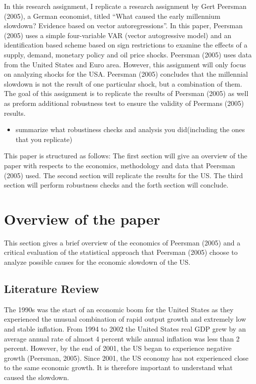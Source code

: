 \documentclass[11pt,preprint, authoryear]{elsarticle}
\numberwithin{equation}{section}
\numberwithin{figure}{section}
\numberwithin{table}{section}
\def\tightlist{} %
\begin{document}
In this research assignment, I replicate a research assignment by Gert
Peersman (2005), a German economist, titled ``What caused the early
millennium slowdown? Evidence based on vector autoregressions''. In this
paper, Peersman (2005) uses a simple four-variable VAR (vector
autogressive model) and an identification based scheme based on sign
restrictions to examine the effects of a supply, demand, monetary policy
and oil price shocks. Peersman (2005) uses data from the United States
and Euro area. However, this assignment will only focus on analyzing
shocks for the USA. Peersman (2005) concludes that the millennial
slowdown is not the result of one particular shock, but a combination of
them. The goal of this assignment is to replicate the results of
Peersman (2005) as well as preform additional robustness test to ensure
the validity of Peermans (2005) results.

\begin{itemize}
\tightlist
\item
  summarize what robustiness checks and analysis you did(including the
  ones that you replicate)
\end{itemize}

This paper is structured as follows: The first section will give an
overview of the paper with respects to the economics, methodology and
data that Peersman (2005) used. The second section will replicate the
results for the US. The third section will perform robustness checks and
the forth section will conclude.

\hypertarget{overview-of-the-paper}{%
\section{Overview of the paper}\label{overview-of-the-paper}}

This section gives a brief overview of the economics of Peersman (2005)
and a critical evaluation of the statistical approach that Peersman
(2005) choose to analyze possible causes for the economic slowdown of
the US.

\hypertarget{literature-review}{%
\subsection{Literature Review}\label{literature-review}}

The 1990s was the start of an economic boom for the United States as
they experienced the unusual combination of rapid output growth and
extremely low and stable inflation. From 1994 to 2002 the United States
real GDP grew by an average annual rate of almost 4 percent while annual
inflation was less than 2 percent. However, by the end of 2001, the US
began to experience negative growth (Peersman, 2005). Since 2001, the US
economy has not experienced close to the same economic growth. It is
therefore important to understand what caused the slowdown.
\end{document}
